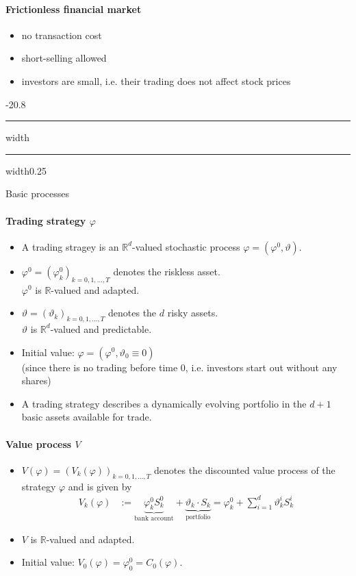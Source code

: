 \documentclass[a4paper,landscape,8pt,fleqn]{scrartcl}
\makeatletter
\renewcommand{\subsection}{\@startsection{subsection}{1}{0mm}%
{-2\baselineskip}{0.8\baselineskip}%
{\hrule depth 0.2pt width\columnwidth\hrule depth0.75pt
width0.25\columnwidth\vspace*{1.2em}\large\bfseries}}
\makeatother
\begin{document}
\begin{multicols*}{3}
\paragraph{Frictionless financial market}

\begin{itemize}
\item no transaction cost
\item short-selling allowed
\item investors are small, i.e. their trading does not affect stock prices
\end{itemize}

\subsection{Basic processes}

\paragraph{Trading strategy $\varphi$}

\begin{itemize}
\item A trading stragey is an $\mathbb{R}^d$-valued stochastic process $\varphi = (\varphi^0, \vartheta)$.
\item $\varphi^0 = (\varphi_k^0)_{k=0,1, \ldots, T}$ denotes the riskless asset. \\
$\varphi^0$ is $\mathbb{R}$-valued and adapted.
\item $\vartheta = (\vartheta_k)_{k=0,1, \ldots, T}$ denotes the $d$ risky assets. \\
$\vartheta$ is $\mathbb{R}^d$-valued and predictable.
\item Initial value: $\varphi = (\varphi^0,\vartheta_0 \equiv 0)$ \\
(since there is no trading before time 0, i.e. investors start out without any shares)
\item A trading strategy describes a dynamically evolving portfolio in the $d+1$ basic assets available for trade.
\end{itemize}

\paragraph{Value process $V$}

\begin{itemize}
\item $V(\varphi) = (V_k(\varphi))_{k=0,1, \ldots, T}$ denotes the discounted value process of the strategy $\varphi$ and is given by
\begin{align*}
V_k(\varphi) &:= \underbrace{\varphi_k^0 S_k^0}_{\text{bank account}} + \underbrace{\vartheta_k \cdot S_k}_{\text{portfolio}} = \varphi_k^0 + \sum_{i=1}^d \vartheta_k^i S_k^i
\end{align*}
\item $V$ is $\mathbb{R}$-valued and adapted.
\item Initial value: $V_0(\varphi) = \varphi_0^0 = C_0(\varphi)$.
\end{itemize}


\end{multicols*}
\end{document}
